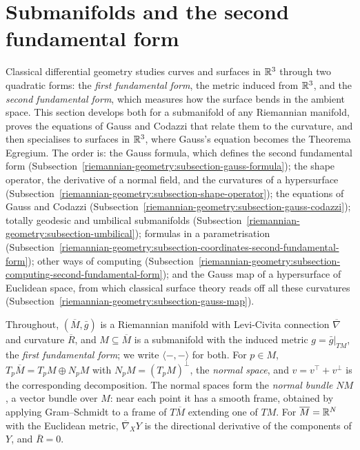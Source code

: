 \section{Submanifolds and the second fundamental form}\label{riemannian-geometry:section-submanifolds}

Classical differential geometry studies curves and surfaces in $\mathbb{R}^3$ through two quadratic forms: the \emph{first fundamental form}, the metric induced from
$\mathbb{R}^3$, and the \emph{second fundamental form}, which measures how the surface bends in the ambient space. This section develops both for a submanifold of
any Riemannian manifold, proves the equations of Gauss and Codazzi that relate them to the curvature, and then specialises to surfaces in $\mathbb{R}^3$, where Gauss's
equation becomes the Theorema Egregium. The order is: the Gauss formula, which defines the second fundamental form (Subsection~\ref{riemannian-geometry:subsection-gauss-formula}); the shape operator, the derivative of a normal field, and the curvatures of a hypersurface (Subsection~\ref{riemannian-geometry:subsection-shape-operator}); the equations of Gauss and Codazzi (Subsection~\ref{riemannian-geometry:subsection-gauss-codazzi}); totally geodesic and umbilical submanifolds (Subsection~\ref{riemannian-geometry:subsection-umbilical}); formulas in a parametrisation (Subsection~\ref{riemannian-geometry:subsection-coordinates-second-fundamental-form}); other ways of computing (Subsection~\ref{riemannian-geometry:subsection-computing-second-fundamental-form}); and the Gauss map of a hypersurface of Euclidean space, from which classical surface theory reads off all these curvatures (Subsection~\ref{riemannian-geometry:subsection-gauss-map}).

Throughout, $(\overline{M}, \bar{g})$ is a Riemannian manifold with Levi-Civita connection $\overline{\nabla}$ and curvature $\overline{R}$, and
$M \subseteq \overline{M}$ is a submanifold with the induced metric $g = \bar{g}|_{TM}$, the \emph{first fundamental form}; we write $\langle -, - \rangle$ for
both. For $p \in M$, $T_p\overline{M} = T_pM \oplus N_pM$ with $N_pM = (T_pM)^\perp$, the \emph{normal space}, and $v = v^\top + v^\perp$ is the corresponding
decomposition. The normal spaces form the \emph{normal bundle} $NM$, a vector bundle over $M$: near each point it has a smooth frame, obtained by applying
Gram--Schmidt to a frame of $T\overline{M}$ extending one of $TM$. For $\overline{M} = \mathbb{R}^N$ with the Euclidean metric, $\overline{\nabla}_XY$ is the directional
derivative of the components of $Y$, and $\overline{R} = 0$.

